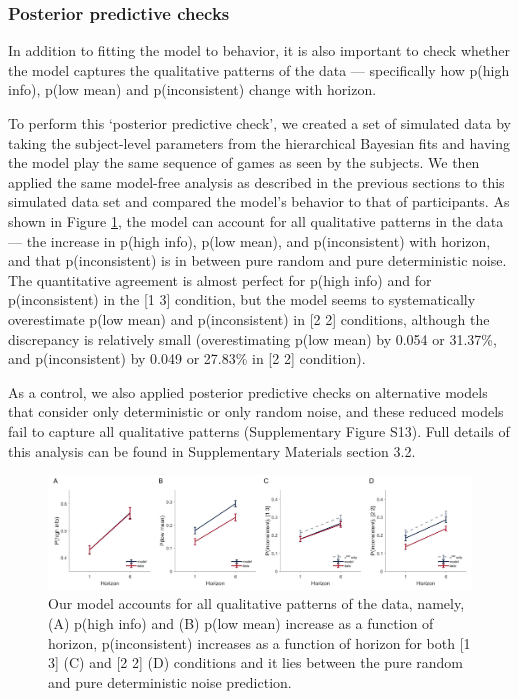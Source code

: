 \documentclass[12pt]{article}
\begin{document}
{\subsubsection*{Posterior predictive checks}
In addition to fitting the model to behavior, it is also important to check whether the model captures the qualitative patterns of the data \citep{Wilson2019, Palminteri} --- specifically how p(high info), p(low mean) and p(inconsistent) change with horizon.

To perform this `posterior predictive check', we created a set of simulated data by taking the subject-level parameters from the hierarchical Bayesian fits and having the model play the same sequence of games as seen by the subjects. We then applied the same model-free analysis as described in the previous sections to this simulated data set and compared the model's behavior to that of participants. As shown in Figure \ref{fig:mb3}, the model can account for all qualitative patterns in the data --- the increase in p(high info), p(low mean), and p(inconsistent) with horizon, and that p(inconsistent) is in between pure random and pure deterministic noise. The quantitative agreement is almost perfect for p(high info) and for p(inconsistent) in the [1 3] condition, but the model seems to systematically overestimate p(low mean) and p(inconsistent) in [2 2] conditions, although the discrepancy is relatively small (overestimating p(low mean) by 0.054 or 31.37\%, and p(inconsistent) by 0.049 or 27.83\% in [2 2] condition). 

As a control, we also applied posterior predictive checks on alternative models that consider only deterministic or only random noise, and these reduced models fail to capture all qualitative patterns (Supplementary Figure S13). Full details of this analysis can be found in Supplementary Materials section 3.2.  

\begin{figure}[H]
\begin{center}
	\includegraphics[width=1\textwidth]{figures/RDBayes_2noise_modelA.jpg}
	\caption{
		Our model accounts for all qualitative patterns of the data, namely, (A) p(high info) and (B) p(low mean) increase as a function of horizon, p(inconsistent) increases as a function of horizon for both [1 3] (C) and [2 2] (D) conditions and it lies between the pure random and pure deterministic noise prediction.}
	\label{fig:mb3}
\end{center}
\end{figure}


}
\end{document}
